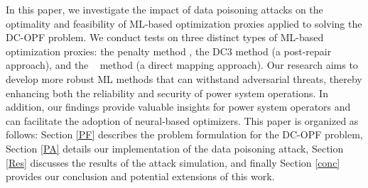 In this paper, we investigate the impact of data poisoning attacks on the optimality and feasibility of ML-based optimization proxies applied to solving the DC-OPF problem.
We conduct tests on three distinct types of ML-based optimization proxies: the penalty method \cite{Liu2022Pen}, the DC3 method \cite{Li_2023} (a post-repair approach), and the \LOOPLC~ method \cite{donti2021dc3} (a direct mapping approach). Our research aims to develop more robust ML methods that can withstand adversarial threats, thereby enhancing both the reliability and security of power system operations. In addition, our findings provide valuable insights for power system operators and can facilitate the adoption of neural-based optimizers. This paper is organized as follows: Section \ref{PF} describes the problem formulation for the DC-OPF problem, Section \ref{PA} details our implementation of the data poisoning attack, Section \ref{Res} discusses the results of the attack simulation, and finally Section \ref{conc} provides our conclusion and potential extensions of this work.





